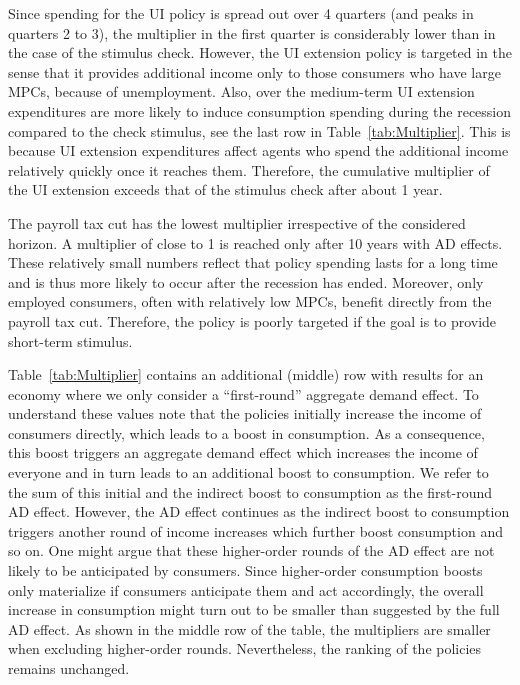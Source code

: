 \documentclass[\latexroot/\projectname]{subfiles}
\begin{document}
Since spending for the UI policy is spread out over 4 quarters (and peaks in quarters 2 to 3), the multiplier in the first quarter is considerably lower than in the case of the stimulus check.
However, the UI extension policy is targeted in the sense that it provides additional income only to those consumers who have large MPCs, because of unemployment.
Also, over the medium-term UI extension expenditures   are more likely to induce consumption spending during the recession compared to the check stimulus, see the last row in Table~\ref{tab:Multiplier}.
This is because UI extension expenditures affect agents who spend the additional income relatively quickly once it reaches them.
Therefore, the cumulative multiplier of the UI extension exceeds that of the stimulus check after about 1 year.



The payroll tax cut has the lowest multiplier irrespective of the considered horizon.
A multiplier of close to 1 is reached only after 10 years with AD effects.
These relatively small numbers reflect that policy spending lasts for a long time and is thus more likely to occur after the recession has ended.
Moreover, only employed consumers, often with relatively low MPCs, benefit directly from the payroll tax cut.
Therefore, the policy is poorly targeted if the goal is to provide short-term stimulus.

Table~\ref{tab:Multiplier} contains an additional (middle) row with results for an economy where we only consider a ``first-round'' aggregate demand effect.
To understand these values note that the policies initially increase the income of consumers directly, which leads to a boost in consumption.
As a consequence, this boost triggers an aggregate demand effect which increases the income of everyone and in turn leads to an additional boost to consumption.
We refer to the sum of this initial and the indirect boost to consumption as the first-round AD effect.
However, the AD effect continues as the indirect boost to consumption triggers another round of income increases which further boost consumption and so on.
One might argue that these higher-order rounds of the AD effect are not likely to be anticipated by consumers.
Since higher-order consumption boosts only materialize if consumers anticipate them and act accordingly, the overall increase in consumption might turn out to be smaller than suggested by the full AD effect.
As shown in the middle row of the table, the multipliers are smaller when excluding higher-order rounds.
Nevertheless, the ranking of the policies remains unchanged.
\end{document}
